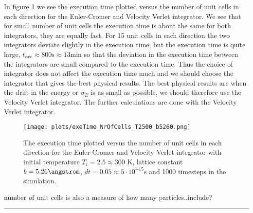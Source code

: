 \documentclass[11pt,a4wide]{article}
\begin{document}
In figure \ref{fig: exe_cells} we see the execution time plotted versus the number of unit cells in each direction for the Euler-Cromer and Velocity Verlet integrator. We see that for small number of unit cells the execution time is about the same for both integrators, they are equally fast. For 15 unit cells in each direction the two integrators deviate slightly in the execution time, but the execution time is quite large, $t_{exe} \approx 800 \mathrm{s} \approx 13 \mathrm{min}$ so that the deviation in the execution time between the integrators are small compared to the execution time. Thus the choice of integrator does not affect the execution time much and we should choose the integrator that gives the best physical results. The best physical results are when the drift in the energy or $\sigma_E$ is as small as possible, we should therefore use the Velocity Verlet integrator. The further calculations are done with the Velocity Verlet integrator. 

\begin{figure}[htp]
\centering
\texttt{[image: plots/exeTime\_NrOfCells\_T2500\_b5260.png]}
\caption{The execution time plotted versus the number of unit cells in each direction for the Euler-Cromer and Velocity Verlet integrator with initial temperature $T_i = 2.5 \approx 300$ K, lattice constant $b=5.26 \angstrom$, $dt=0.05\approx  5\cdot 10^{-15}$s and 1000 timesteps in the simulation.}
\label{fig: exe_cells}
\end{figure}

number of unit cells is also a measure of how many particles..include?







\centering
\rule{0.3\textwidth}{0.4pt}\par %
\end{document}
